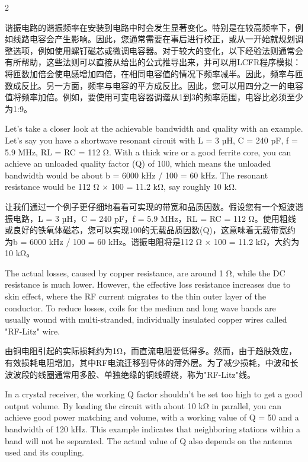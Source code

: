 \documentclass{ctexbook}
\begin{document}
\begin{paracol}{2}
\switchcolumn

谐振电路的谐振频率在安装到电路中时会发生显著变化。特别是在较高频率下，例如线路电容会产生影响。因此，您通常需要在事后进行校正，或从一开始就规划调整选项，例如使用螺钉磁芯或微调电容器。对于较大的变化，以下经验法则通常会有所帮助，这些法则可以直接从给出的公式推导出来，并可以用LCFR程序模拟：将匝数加倍会使电感增加四倍，在相同电容值的情况下频率减半。因此，频率与匝数成反比。另一方面，频率与电容的平方成反比。因此，您可以用四分之一的电容值将频率加倍。例如，要使用可变电容器调谐从1到3的频率范围，电容比必须至少为1:9。

\switchcolumn*

Let's take a closer look at the achievable bandwidth and quality with an example. Let's say 
you have a shortwave resonant circuit with L = 3 µH, C = 240 pF, f = 5.9 MHz, RL = RC = 
112 Ω. With a thick wire or a good ferrite core, you can achieve an unloaded quality factor 
(Q) of 100, which means the unloaded bandwidth would be about b = 6000 kHz / 100 = 
60 kHz. The resonant resistance would be 112 Ω × 100 = 11.2 kΩ, say roughly 10 kΩ. 

\switchcolumn

让我们通过一个例子更仔细地看看可实现的带宽和品质因数。假设您有一个短波谐振电路，L = 3 µH，C = 240 pF，f = 5.9 MHz，RL = RC = 112 Ω。使用粗线或良好的铁氧体磁芯，您可以实现100的无载品质因数(Q)，这意味着无载带宽约为b = 6000 kHz / 100 = 60 kHz。谐振电阻将是112 Ω × 100 = 11.2 kΩ，大约为10 kΩ。

\switchcolumn*

The actual losses, caused by copper resistance, are around 1 Ω, while the DC resistance is 
much lower. However, the effective loss resistance increases due to skin effect, where the 
RF current migrates to the thin outer layer of the conductor. To reduce losses, coils for the 
medium and long wave bands are usually wound with multi-stranded, individually insulated 
copper wires called "RF-Litz" wire. 

\switchcolumn

由铜电阻引起的实际损耗约为1Ω，而直流电阻要低得多。然而，由于趋肤效应，有效损耗电阻增加，其中RF电流迁移到导体的薄外层。为了减少损耗，中波和长波波段的线圈通常用多股、单独绝缘的铜线缠绕，称为"RF-Litz"线。

\switchcolumn*

In a crystal receiver, the working Q factor shouldn't be set too high to get a good output 
volume. By loading the circuit with about 10 kΩ in parallel, you can achieve good power 
matching and volume, with a working value of Q = 50 and a bandwidth of 120 kHz. This 
example indicates that neighboring stations within a band will not be separated. The actual 
value of Q also depends on the antenna used and its coupling.


\end{paracol}
\end{document}
